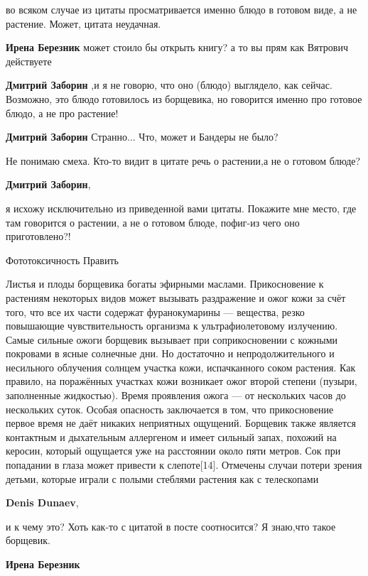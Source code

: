 \begin{itemize}
\begin{itemize}
во всяком случае из цитаты просматривается именно блюдо в готовом виде, а не
растение. Может, цитата неудачная.


\textbf{Ирена Березник} может стоило бы открыть книгу? а то вы прям как Вятрович действуете

\textbf{Дмитрий Заборин} ,и я не говорю, что оно (блюдо) выглядело, как сейчас. Возможно, это блюдо готовилось из борщевика, но говорится именно про готовое блюдо, а не про растение!

\textbf{Дмитрий Заборин} Странно...
Что, может и Бандеры не было?

Не понимаю смеха. Кто-то видит в цитате речь о растении,а не о готовом блюде?

\textbf{Дмитрий Заборин},

я исхожу исключительно из приведенной вами цитаты. Покажите мне место, где там
говорится о растении, а не о готовом блюде, пофиг-из чего оно приготовлено?!

Фототоксичность Править

Листья и плоды борщевика богаты эфирными маслами. Прикосновение к растениям
некоторых видов может вызывать раздражение и ожог кожи за счёт того, что все их
части содержат фуранокумарины — вещества, резко повышающие чувствительность
организма к ультрафиолетовому излучению. Самые сильные ожоги борщевик вызывает
при соприкосновении с кожными покровами в ясные солнечные дни. Но достаточно и
непродолжительного и несильного облучения солнцем участка кожи, испачканного
соком растения. Как правило, на поражённых участках кожи возникает ожог второй
степени (пузыри, заполненные жидкостью). Время проявления ожога — от нескольких
часов до нескольких суток. Особая опасность заключается в том, что
прикосновение первое время не даёт никаких неприятных ощущений. Борщевик также
является контактным и дыхательным аллергеном и имеет сильный запах, похожий на
керосин, который ощущается уже на расстоянии около пяти метров. Сок при
попадании в глаза может привести к слепоте[14]. Отмечены случаи потери зрения
детьми, которые играли с полыми стеблями растения как с телескопами

\textbf{Denis Dunaev},

и к чему это? Хоть как-то с цитатой в посте соотносится? Я знаю,что такое
борщевик.

\textbf{Ирена Березник} 


\end{itemize}
\end{itemize}
